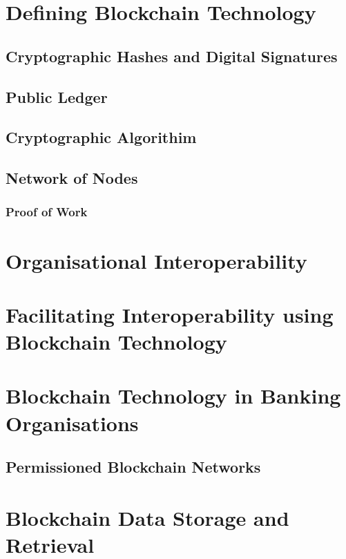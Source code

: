 \section{Defining Blockchain Technology}

\subsection{Cryptographic Hashes and Digital Signatures}

\subsection{Public Ledger}

\subsection{Cryptographic Algorithim}

\subsection{Network of Nodes}

\subsubsection{Proof of Work}

\section{Organisational Interoperability}

\section{Facilitating Interoperability using Blockchain Technology}

\section{Blockchain Technology in Banking Organisations}

\subsection{Permissioned Blockchain Networks}

\section{Blockchain Data Storage and Retrieval}